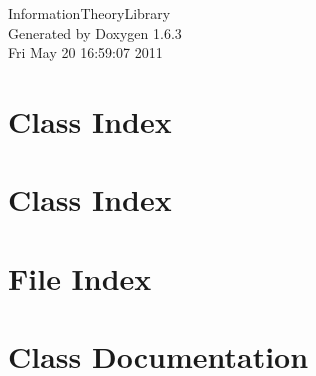 \documentclass[a4paper]{book}
\begin{document}
\hypersetup{pageanchor=false}
\begin{titlepage}
\vspace*{7cm}
\begin{center}
{\Large InformationTheoryLibrary }\\
\vspace*{1cm}
{\large Generated by Doxygen 1.6.3}\\
\vspace*{0.5cm}
{\small Fri May 20 16:59:07 2011}\\
\end{center}
\end{titlepage}
\clearemptydoublepage
{}
\tableofcontents
\clearemptydoublepage
{}
\hypersetup{pageanchor=true}
\chapter{Class Index}

\chapter{Class Index}

\chapter{File Index}

\chapter{Class Documentation}


























\end{document}
